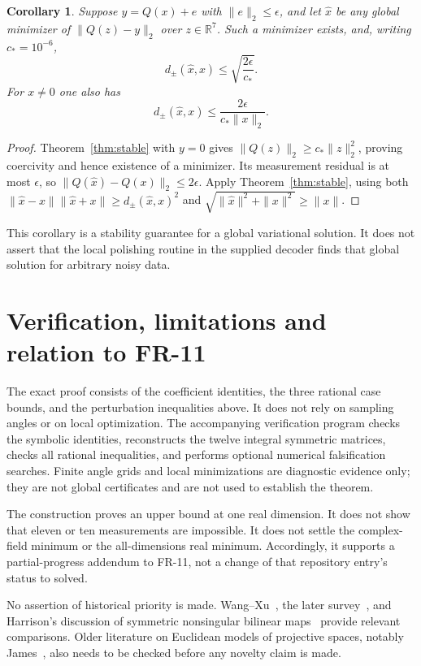 \documentclass[11pt]{article}
\newtheorem{corollary}[theorem]{Corollary}
\theoremstyle{remark}\newtheorem{remark}[theorem]{Remark}
\newcommand{\R}{\mathbb R}\newcommand{\C}{\mathbb C}
\begin{document}
\begin{corollary}\label{cor:noise}
Suppose $y=Q(x)+e$ with $\|e\|_2\le\epsilon$, and let $\widehat x$ be any global minimizer of $\|Q(z)-y\|_2$ over $z\in\R^7$. Such a minimizer exists, and, writing $c_*=10^{-6}$,
\[
 d_\pm(\widehat x,x)\le\sqrt{\frac{2\epsilon}{c_*}}.
\]
For $x\ne0$ one also has
\[
 d_\pm(\widehat x,x)\le\frac{2\epsilon}{c_*\|x\|_2}.
\]
\end{corollary}
\begin{proof}
Theorem~\ref{thm:stable} with $y=0$ gives $\|Q(z)\|_2\ge c_*\|z\|_2^2$, proving coercivity and hence existence of a minimizer. Its measurement residual is at most $\epsilon$, so $\|Q(\widehat x)-Q(x)\|_2\le2\epsilon$. Apply Theorem~\ref{thm:stable}, using both $\|\widehat x-x\|\|\widehat x+x\|\ge d_\pm(\widehat x,x)^2$ and $\sqrt{\|\widehat x\|^2+\|x\|^2}\ge\|x\|$.
\end{proof}

This corollary is a stability guarantee for a global variational solution. It does not assert that the local polishing routine in the supplied decoder finds that global solution for arbitrary noisy data.

\section{Verification, limitations and relation to FR-11}
The exact proof consists of the coefficient identities, the three rational case bounds, and the perturbation inequalities above. It does not rely on sampling angles or on local optimization. The accompanying verification program checks the symbolic identities, reconstructs the twelve integral symmetric matrices, checks all rational inequalities, and performs optional numerical falsification searches. Finite angle grids and local minimizations are diagnostic evidence only; they are not global certificates and are not used to establish the theorem.

The construction proves an upper bound at one real dimension. It does not show that eleven or ten measurements are impossible. It does not settle the complex-field minimum or the all-dimensions real minimum. Accordingly, it supports a partial-progress addendum to FR-11, not a change of that repository entry's status to solved.

No assertion of historical priority is made. Wang--Xu~\cite{WX}, the later survey~\cite{XuSurvey}, and Harrison's discussion of symmetric nonsingular bilinear maps~\cite{Harrison} provide relevant comparisons. Older literature on Euclidean models of projective spaces, notably James~\cite{James}, also needs to be checked before any novelty claim is made.
\end{document}
